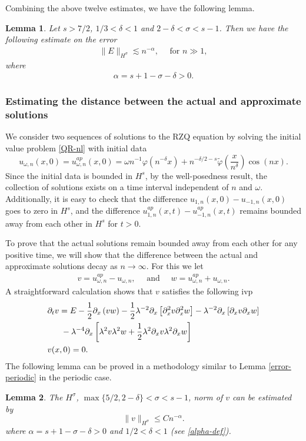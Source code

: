 \documentclass[reqno]{amsart}
\theoremstyle{plain}
\newtheorem{lemma}{Lemma}[section]
\numberwithin{equation}{section}
\begin{document}
 Combining the above twelve estimates, we have the following lemma. 
 \begin{lemma}
 Let $s>7/2$, $1/3<\delta<1$ and $2-\delta <\sigma < s-1$. Then we have the following estimate on the error
 \begin{align}
 \| E\|_{H^\sigma} \lesssim n^{-\alpha} , \quad \text{ for } n \gg 1,
 \end{align}
 where 
\begin{align} \label{alpha-def}
\alpha =  s+1-\sigma-\delta  >0.
\end{align}
 \end{lemma}
 
 \subsubsection{Estimating the distance between the actual and approximate solutions} 
 We consider two sequences of solutions to the RZQ equation by solving the initial value problem \ref{QR-nl}  with initial data 
 $$
 u_{\omega, n}(x,0) = u^{ap} _{\omega, n} (x,0 ) =  \omega n^{-1}   \varphi (n^{-\delta }x) 
 +n^{-\delta/2-s} \widetilde \varphi \left( \frac{x}{n^\delta} \right) \cos(nx ). 
 $$
 Since the initial data is bounded in $H^s$, by the well-posedness result, the collection of solutions exists on a time interval independent of $n$ and $\omega$. Additionally, it is easy to check that the difference $   u_{1, n}(x,0)  -  u_{-1, n}(x,0) $ goes to zero in $H^s$, and the difference $u^{ap} _{1, n} (x,t )-u^{ap} _{-1, n} (x,t )$ remains bounded away from each other in $H^s$ for $t>0$. 
 
 To prove that the actual solutions remain bounded away from each other for any positive time, we will show that the difference between the actual and approximate solutions decay as $n\rightarrow \infty$. For this we let 
 \begin{align}
 v =  u^{ap}_{\omega, n}  -  u _{\omega, n} , \quad \text{ and } \quad  w =  u^{ap}_{\omega, n}   +  u _{\omega, n}.
 \end{align}
A straightforward calculation shows that $v$ satisfies the following ivp
\begin{align}\notag
 & \partial_t v = E -  \frac12 \partial_x\left (vw  \right)  -
 \frac12 \lambda^{-2} \partial_x \left  [\partial_x^2 v  \partial_x^2 w   \right  ]
 - \lambda^{-2}  \partial_x \left [\partial_x   v \partial_x w   \right ]  
 \\ & \ \ \ \ \  -  \lambda^{-4} \partial_x \left [    \lambda  ^2    v \lambda   ^2   w +\frac12    \lambda  ^2  \partial_x   v \lambda   ^2\partial_x     w
   \right ]
\\ & v(x,0) = 0 .
\end{align}
The following lemma can be proved in a methodology similar to Lemma \ref{error-periodic} in the periodic case. 
 \begin{lemma} \label{error-nonperiodic}
The $H^\sigma$, $\max\{5/2, 2-\delta\} <\sigma<s-1$, norm of $v$ can be estimated by
$$
\| v\|_{H^\sigma} \le C n^{-\alpha} .
$$
where $\alpha = s+1-\sigma-\delta  >0$ and $1/2<\delta<1$ (see \eqref{alpha-def}). 
\end{lemma}
 
\end{document}
